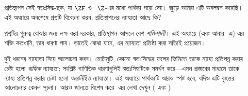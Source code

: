 \documentclass[../../../include/open-logic-section]{subfiles}
\begin{document}

প্রতিস্থাপন সেই স্বতঃসিদ্ধ-ছক, যা $\ZF$ ও
~$\Z$-এর মধ্যে পার্থক্য গড়ে দেয়।
জুড়ে আমরা এটি অবলম্বন করেছি। এই অধ্যায়ে
অবশেষে প্রশ্নটি বিবেচনা করব: প্রতিস্থাপনের
ন্যায্যতা আছে কি?

প্রশ্নটির গুরুত্ব বোঝার জন্য লক্ষ করা দরকার,
প্রতিস্থাপন আসলে বেশ \emph{শক্তিশালী}।
এই অধ্যায়ে (এবং আবার
-এ)
এর শক্তি কতখানি, তার ধারণা পাব। তাতেই
বোঝা যাবে, এর ন্যায্যতা প্রতিষ্ঠা করা
সত্যিই প্রয়োজন।

দুই ধরনের ন্যায্যতা নিয়ে আলোচনা করব। মোটামুটি,
কোনো স্বতঃসিদ্ধের ফলের ভিত্তিতে তাকে ন্যায্য
প্রতিপন্ন করার চেষ্টা হলো \emph{বাহ্যিক} ন্যায্যতা;
সংশ্লিষ্ট গাণিতিক ধারণাগুলিই স্বতঃসিদ্ধটিকে
সমর্থন করে—এমন প্রস্তাবের মাধ্যমে তাকে ন্যায্য
প্রতিপন্ন করার চেষ্টা হলো \emph{অন্তর্নিহিত}
ন্যায্যতা। এই অধ্যায়ে পার্থক্যটি আরও স্পষ্ট
হবে, যদিও এটি বৃহত্তর আলোচনার কেবল সূচনা।
আরও জানতে বিশেষ করে
\citeauthor{Maddy1988a}-এর লেখা দেখুন
(\citeyear{Maddy1988a} এবং
\citeyear{Maddy1988b})।
\end{document}
